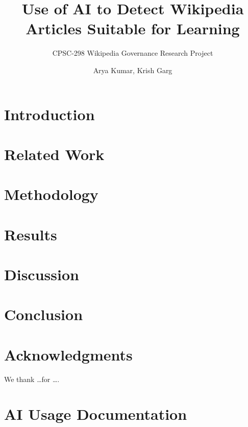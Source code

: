 \documentclass[sigconf,screen]{acmart}
\title{Use of AI to Detect Wikipedia Articles Suitable for Learning}
\subtitle{CPSC-298 Wikipedia Governance Research Project}
\author{Arya Kumar, Krish Garg}
\affiliation{%
  \institution{Chapman University}
  \city{Orange}
  \country{USA}
}
\begin{document}
\maketitle

\section{Introduction}


\section{Related Work}


\section{Methodology}


\section{Results}


\section{Discussion}


\section{Conclusion}


\section*{Acknowledgments}
We thank \dots for \ldots.




\appendix
\section{AI Usage Documentation}

\end{document}
